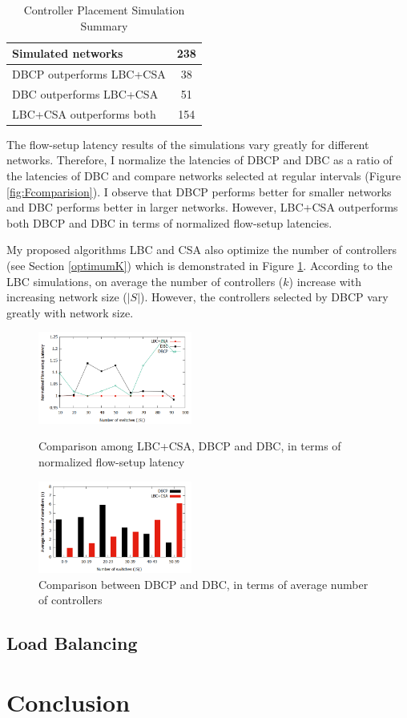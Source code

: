 \documentclass{IEEEtran}
\begin{document}
	\begin{table}
		\centering
		\caption{Controller Placement Simulation Summary} \label{tab:summ1}
		\begin{tabular}{|l|c|}
			\hline
			Simulated networks & 238 \\
			\hline
			DBCP outperforms LBC+CSA & 38 \\
			\hline
			DBC outperforms LBC+CSA & 51 \\
			\hline
			LBC+CSA outperforms both & 154 \\
			\hline
		\end{tabular}
	\end{table}
	The flow-setup latency results of the simulations vary greatly for different networks. Therefore, I normalize the latencies of DBCP and DBC as a ratio of the latencies of DBC and compare networks selected at regular intervals (Figure \ref{fig:Fcomparision}). I observe that DBCP performs better for smaller networks and DBC performs better in larger networks. However, LBC+CSA outperforms both DBCP and DBC in terms of normalized flow-setup latencies.
	
	My proposed algorithms LBC and CSA also optimize the number of controllers (see Section \ref{optimumK}) which is demonstrated in Figure \ref{fig:Kcomparison}. According to the LBC simulations, on average the number of controllers ($k$) increase with increasing network size ($|S|$). However, the controllers selected by DBCP vary greatly with network size.

	\begin{figure}
		\centering
		\includegraphics[width=0.45\textwidth]{Images/forced_comparison.png}
		\caption{Comparison among LBC+CSA, DBCP and DBC, in terms of normalized flow-setup latency} \label{fig:Fcomparision}
		\centering
		\includegraphics[width=0.45\textwidth]{Images/K.png}
		\caption{Comparison between DBCP and DBC, in terms of average number of controllers} \label{fig:Kcomparison}
	\end{figure}

	\subsection{Load Balancing} \label{LoadAnalysis}
	
	\section{Conclusion}
	
	
	
\end{document}

